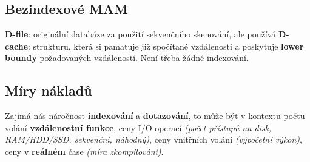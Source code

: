 \subsection{Bezindexové MAM}

\textbf{D-file}: originální databáze za použití sekvenčního skenování, ale používá \textbf{D-cache}: strukturu, která si pamatuje již spočítané vzdálenosti a poskytuje \textbf{lower boundy} požadovaných vzdáleností. Není třeba žádné indexování.

\subsection{Míry nákladů}

Zajímá nás náročnost \textbf{indexování} a \textbf{dotazování}, to může být v kontextu počtu volání \textbf{vzdálenostní funkce}, ceny I/O operací \textit{(počet přístupů na disk, RAM/HDD/SSD, sekvenční, náhodný)}, ceny vnitřních volání \textit{(výpočetní výkon)}, ceny v \textbf{reálném} čase \textit{(míra zkompilování)}.

